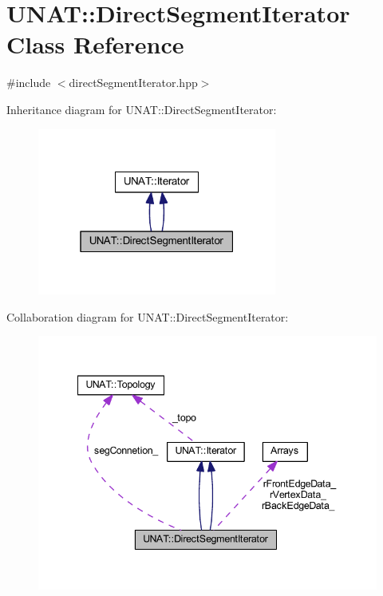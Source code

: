 \hypertarget{classUNAT_1_1DirectSegmentIterator}{}\section{U\+N\+AT\+::Direct\+Segment\+Iterator Class Reference}
\label{classUNAT_1_1DirectSegmentIterator}


{\ttfamily \#include $<$direct\+Segment\+Iterator.\+hpp$>$}



Inheritance diagram for U\+N\+AT\+::Direct\+Segment\+Iterator\+:
\nopagebreak
\begin{figure}[H]
\begin{center}
\leavevmode
\includegraphics[width=223pt]{classUNAT_1_1DirectSegmentIterator__inherit__graph}
\end{center}
\end{figure}


Collaboration diagram for U\+N\+AT\+::Direct\+Segment\+Iterator\+:
\nopagebreak
\begin{figure}[H]
\begin{center}
\leavevmode
\includegraphics[width=342pt]{classUNAT_1_1DirectSegmentIterator__coll__graph}
\end{center}
\end{figure}
